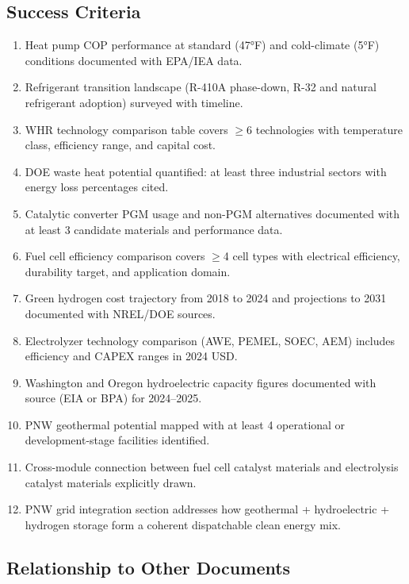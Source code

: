 \documentclass[11pt,letterpaper]{article}
\begin{document}
\subsection{Success Criteria}

\begin{enumerate}
  \item Heat pump COP performance at standard (47°F) and cold-climate (5°F) conditions documented with EPA/IEA data.
  \item Refrigerant transition landscape (R-410A phase-down, R-32 and natural refrigerant adoption) surveyed with timeline.
  \item WHR technology comparison table covers $\geq$6 technologies with temperature class, efficiency range, and capital cost.
  \item DOE waste heat potential quantified: at least three industrial sectors with energy loss percentages cited.
  \item Catalytic converter PGM usage and non-PGM alternatives documented with at least 3 candidate materials and performance data.
  \item Fuel cell efficiency comparison covers $\geq$4 cell types with electrical efficiency, durability target, and application domain.
  \item Green hydrogen cost trajectory from 2018 to 2024 and projections to 2031 documented with NREL/DOE sources.
  \item Electrolyzer technology comparison (AWE, PEMEL, SOEC, AEM) includes efficiency and CAPEX ranges in 2024 USD.
  \item Washington and Oregon hydroelectric capacity figures documented with source (EIA or BPA) for 2024--2025.
  \item PNW geothermal potential mapped with at least 4 operational or development-stage facilities identified.
  \item Cross-module connection between fuel cell catalyst materials and electrolysis catalyst materials explicitly drawn.
  \item PNW grid integration section addresses how geothermal + hydroelectric + hydrogen storage form a coherent dispatchable clean energy mix.
\end{enumerate}

\subsection{Relationship to Other Documents}
\end{document}
